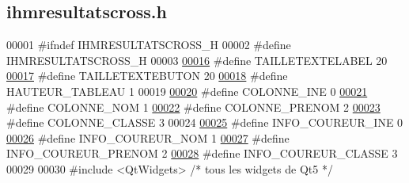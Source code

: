 \hypertarget{ihmresultatscross_8h_source}{}\subsection{ihmresultatscross.\+h}
\label{ihmresultatscross_8h_source}

\begin{DoxyCode}
00001 \textcolor{preprocessor}{#ifndef IHMRESULTATSCROSS\_H}
00002 \textcolor{preprocessor}{#define IHMRESULTATSCROSS\_H}
00003 
\hyperlink{ihmresultatscross_8h_a407f067284fd7ac16426ac29cbfcd356}{00016} \textcolor{preprocessor}{#define TAILLETEXTELABEL 20}
\hyperlink{ihmresultatscross_8h_a93c1a7628e080979c2ae8f83b6c69606}{00017} \textcolor{preprocessor}{#define TAILLETEXTEBUTON 20}
\hyperlink{ihmresultatscross_8h_ab9a42df347efcfb62cef09920a200588}{00018} \textcolor{preprocessor}{#define HAUTEUR\_TABLEAU 1}
00019 
\hyperlink{ihmresultatscross_8h_aa8208c9f9fd2ea2418e4b7bb28175f80}{00020} \textcolor{preprocessor}{#define COLONNE\_INE         0}
\hyperlink{ihmresultatscross_8h_aeee76385895c145ef5a633e6c6812603}{00021} \textcolor{preprocessor}{#define COLONNE\_NOM         1}
\hyperlink{ihmresultatscross_8h_a5d6f240d26209cd66db8aa5e1aac62f9}{00022} \textcolor{preprocessor}{#define COLONNE\_PRENOM      2}
\hyperlink{ihmresultatscross_8h_a114680edc01528f77bb689b0a2ca18a2}{00023} \textcolor{preprocessor}{#define COLONNE\_CLASSE      3}
00024 
\hyperlink{ihmresultatscross_8h_a2e5435ad2b0c61674b2dad6c0ea46301}{00025} \textcolor{preprocessor}{#define INFO\_COUREUR\_INE        0}
\hyperlink{ihmresultatscross_8h_a71b99ea06ae916bcd158edbd441c8c24}{00026} \textcolor{preprocessor}{#define INFO\_COUREUR\_NOM        1}
\hyperlink{ihmresultatscross_8h_a68fd2611ad0ef66da1a71726675067e7}{00027} \textcolor{preprocessor}{#define INFO\_COUREUR\_PRENOM     2}
\hyperlink{ihmresultatscross_8h_a104dfa4cfc656a690caaec36fd4d3e2d}{00028} \textcolor{preprocessor}{#define INFO\_COUREUR\_CLASSE     3}
00029 
00030 \textcolor{preprocessor}{#include <QtWidgets>} \textcolor{comment}{/* tous les widgets de Qt5 */}

\end{DoxyCode}
